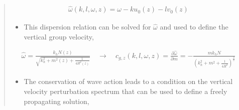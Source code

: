\documentclass[letterpaper,10pt,english]{sphinxmanual}
\begin{document}
\begin{itemize}
\begin{quote}
\begin{itemize}
\end{itemize}
\begin{equation*}
\begin{split}\hat{\omega} \left( k, l, \omega, z \right) = \omega - k u_0 \left( z \right) - l v_0 \left( z \right)\end{split}
\end{equation*}\begin{itemize}
\item {} 
\sphinxAtStartPar
This dispersion relation can be solved for \(\hat{\omega}\) and used to define the vertical group velocity,

\end{itemize}
\begin{equation*}
\begin{split}\hat{\omega} = \frac{k_h N \left( z \right)}{\sqrt{ k_h^2 + m^2 \left( z \right) + \frac{1}{4 H^2 \left( z \right)}}} \quad \rightarrow \quad
c_{g,z} \left(k, l, \omega, z \right) = \frac{\partial \hat{\omega}}{\partial m} = -\frac{m k_h N}{\left( k_h^2 + m^2 + \frac{1}{4 H^2} \right)^\frac{3}{2}}\end{split}
\end{equation*}\begin{itemize}
\item {} 
\sphinxAtStartPar
The conservation of wave action leads to a condition on the vertical velocity perturbation spectrum that can be used to define a freely propagating solution,


\end{itemize}
\end{quote}
\end{itemize}
\end{document}
